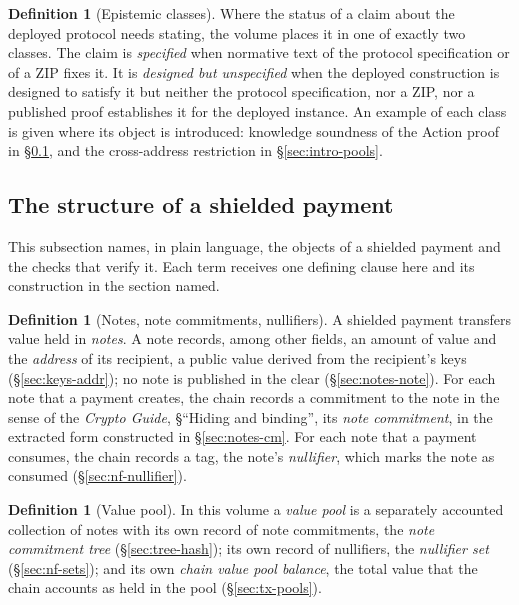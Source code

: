 \documentclass[11pt,a4paper]{article}
\theoremstyle{definition}
\newtheorem{definition}[theorem]{Definition}
\begin{document}
\begin{definition}[Epistemic classes]
Where the status of a claim about the deployed protocol needs stating, the
volume places it in one of exactly two classes. The claim is
\emph{specified} when normative text of the protocol specification or of a
ZIP fixes it. It is \emph{designed but unspecified} when the deployed
construction is designed to satisfy it but neither the protocol
specification, nor a ZIP, nor a published proof establishes it for the
deployed instance. An example of each class is given where its object is
introduced: knowledge soundness of the Action proof in
\S\ref{sec:intro-structure}, and the cross-address restriction in
\S\ref{sec:intro-pools}.
\end{definition}

\subsection{The structure of a shielded payment}\label{sec:intro-structure}

This subsection names, in plain language, the objects of a shielded payment
and the checks that verify it. Each term receives one defining clause here
and its construction in the section named.

\begin{definition}[Notes, note commitments, nullifiers]
A shielded payment transfers value held in \emph{notes}. A note records,
among other fields, an amount of value and the \emph{address} of its
recipient, a public value derived from the recipient's keys
(\S\ref{sec:keys-addr}); no note is published in the clear
(\S\ref{sec:notes-note}). For each note that a payment creates, the chain
records a commitment to the note in the sense of the \emph{Crypto Guide},
\S``Hiding and binding'', its \emph{note commitment}, in the extracted form
constructed in \S\ref{sec:notes-cm}. For each note that a payment
consumes, the chain records a tag, the note's \emph{nullifier}, which marks
the note as consumed (\S\ref{sec:nf-nullifier}).
\end{definition}

\begin{definition}[Value pool]
In this volume a \emph{value pool} is a separately accounted collection of
notes with its own record of note commitments, the \emph{note commitment
tree} (\S\ref{sec:tree-hash}); its own record of nullifiers, the
\emph{nullifier set} (\S\ref{sec:nf-sets}); and its own \emph{chain value
pool balance}, the total value that the chain accounts as held in the pool
(\S\ref{sec:tx-pools}).
\end{definition}
\end{document}
